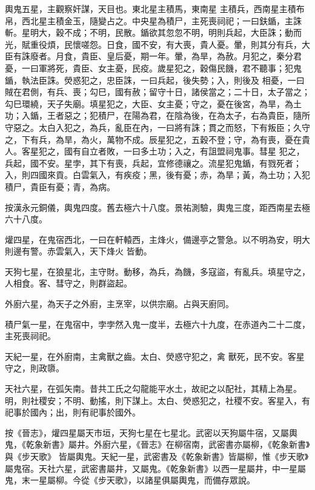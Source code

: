 \begin{pinyinscope}
 輿鬼五星，主觀察奸謀，天目也。東北星主積馬，東南星
 主積兵，西南星主積布帛，西北星主積金玉，隨變占之。中央星為積尸，主死喪祠祀；一曰鈇鍎，主誅斬。星明大，穀不成；不明，民散。鍎欲其忽忽不明，明則兵起，大臣誅；動而光，賦重役煩，民懷嗟怨。日食，國不安，有大喪，貴人憂。暈，則其分有兵，大臣有誅廢者。月食，貴臣、皇后憂，期一年。暈，為旱，為赦。月犯之，秦分君憂，一曰軍將死，貴臣、女主憂，民疫。歲星犯之，穀傷民饑，君不聽事；犯鬼鍎，執法臣誅。熒惑犯之，忠臣誅，一曰兵起，後失勢；入，則後及
 相憂，一曰賊在君側，有兵、喪；勾巳，國有赦；留守十日，諸侯當之；二十日，太子當之；勾巳環繞，天子失廟。填星犯之，大臣、女主憂；守之，憂在後宮，為旱，為土功；入鍎，王者惡之；犯積尸，在陽為君，在陰為後，在為太子，右為貴臣，隨所守惡之。太白入犯之，為兵，亂臣在內，一曰將有誅；貫之而怒，下有叛臣；久守之，下有兵，為旱，為火，萬物不成。辰星犯之，五穀不登；守，為有喪，憂在貴人。客星犯之，國有自立者敗，一曰多土功；入之，有詛盟祠鬼事。彗星
 犯之，兵起，國不安。星孛，其下有喪，兵起，宜修德禳之。流星犯鬼鍎，有戮死者；入，則四國來貢。白雲氣入，有疾疫；黑，後有憂；赤，為旱；黃，為土功；入犯積尸，貴臣有憂；青，為病。



 按漢永元銅儀，輿鬼四度。舊去極六十八度。景祐測驗，輿鬼三度，距西南星去極六十八度。



 爟四星，在鬼宿西北，一曰在軒轅西，主烽火，備邊亭之警急。以不明為安，明大則邊有警。赤雲氣入，天下烽火
 皆動。



 天狗七星，在狼星北，主守財。動移，為兵，為饑，多寇盜，有亂兵。填星守之，人相食。客、彗守之，則群盜起。



 外廚六星，為天子之外廚，主烹宰，以供宗廟。占與天廚同。



 積尸氣一星，在鬼宿中，孛孛然入鬼一度半，去極六十九度，在赤道內二十二度，主死喪祠祀。



 天紀一星，在外廚南，主禽獸之齒。太白、熒惑守犯之，禽
 獸死，民不安。客星守之，則政隳。



 天社六星，在弧矢南。昔共工氏之勾龍能平水土，故祀之以配社，其精上為星。明，則社稷安；不明、動搖，則下謀上。太白、熒惑犯之，社稷不安。客星入，有祀事於國內；出，則有祀事於國外。



 按《晉志》，爟四星屬天市垣，天狗七星在七星北。武密以天狗屬牛宿，又屬輿鬼，《乾象新書》屬井。外廚六星，《晉志》在柳宿南，武密書亦屬柳，《乾象新書》與《步天歌》
 皆屬輿鬼。天紀一星，武密書及《乾象新書》皆屬柳，惟《步天歌》屬鬼宿。天社六星，武密書屬井，又屬鬼。《乾象新書》以西一星屬井，中一星屬鬼，末一星屬柳。今從《步天歌》，以諸星俱屬輿鬼，而備存眾說。




\end{pinyinscope}
